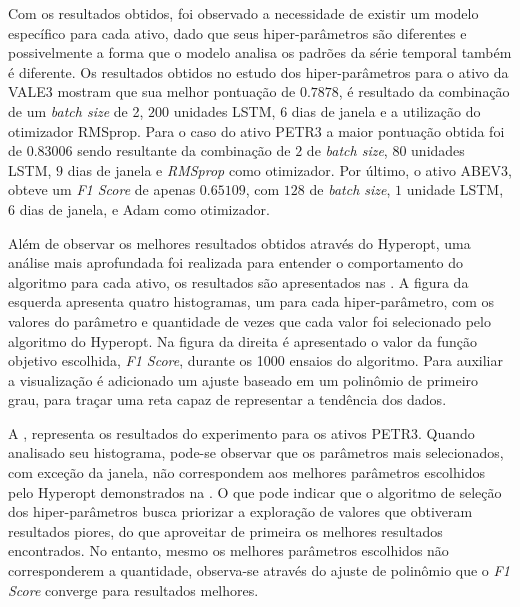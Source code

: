 

Com os resultados obtidos, foi observado a necessidade de existir um modelo específico para cada ativo, dado que seus hiper-parâmetros são diferentes e possivelmente a forma que o modelo analisa os padrões da série temporal também é diferente. Os resultados obtidos no estudo dos hiper-parâmetros para o ativo da VALE3 mostram que sua melhor pontuação de $0.7878$, é resultado da combinação de um \textit{batch size} de 2, $200$ unidades LSTM, $6$ dias de janela e a utilização do otimizador RMSprop. Para o caso do ativo PETR3 a maior pontuação obtida foi de $0.83006$ sendo resultante da combinação de $2$ de \textit{batch size}, $80$ unidades \acrshort{LSTM}, $9$ dias de janela e \textit{RMSprop} como otimizador. Por último, o ativo ABEV3, obteve um \textit{F1 Score} de apenas $0.65109$, com $128$ de \textit{batch size}, $1$ unidade \acrshort{LSTM}, $6$ dias de janela, e Adam como otimizador.

Além de observar os melhores resultados obtidos através do Hyperopt, uma análise mais aprofundada foi realizada para entender o comportamento do algoritmo para cada ativo, os resultados são apresentados nas . A figura da esquerda apresenta quatro histogramas, um para cada hiper-parâmetro, com os valores do parâmetro e quantidade de vezes que cada valor foi selecionado pelo algoritmo do Hyperopt. Na figura da direita é apresentado o valor da função objetivo escolhida, \emph{F1 Score}, durante os 1000 ensaios do algoritmo. Para auxiliar a visualização é adicionado um ajuste baseado em um polinômio de primeiro grau, para traçar uma reta capaz de representar a tendência dos dados.

A , representa os resultados do experimento para os ativos PETR3. Quando analisado seu histograma, pode-se observar que os parâmetros mais selecionados, com exceção da janela, não correspondem aos melhores parâmetros escolhidos pelo Hyperopt demonstrados na . O que pode indicar que o algoritmo de seleção dos hiper-parâmetros busca priorizar a exploração de valores que obtiveram resultados piores, do que aproveitar de primeira os melhores resultados encontrados. No entanto, mesmo os melhores parâmetros escolhidos não corresponderem a quantidade, observa-se através do ajuste de polinômio que o \emph{F1 Score} converge para resultados melhores.

%

